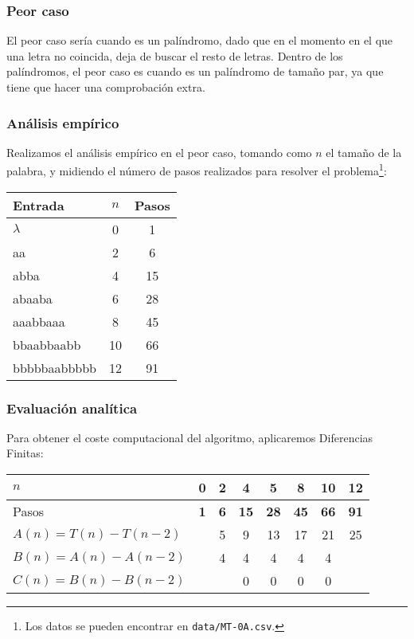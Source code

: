 \subsubsection*{Peor caso}
El peor caso sería cuando es un palíndromo, dado que en el momento en el que una letra no coincida, deja de buscar el resto de letras. Dentro de los palíndromos, el peor caso es cuando es un palíndromo de tamaño par, ya que tiene que hacer una comprobación extra.

\subsubsection*{Análisis empírico}

Realizamos el análisis empírico en el peor caso, tomando como $n$ el tamaño de la palabra, y midiendo el número de pasos realizados para resolver el problema\footnote{Los datos se pueden encontrar en \texttt{data/MT-0A.csv}.}:

\begin{table}[h]
    \centering
    \begin{tabular}{lcc}
        Entrada & $n$ & Pasos \\
        \hline
        $\lambda$      & 0  & 1  \\
        aa             & 2  & 6  \\
        abba           & 4  & 15 \\
        abaaba         & 6  & 28 \\
        aaabbaaa       & 8  & 45 \\
        bbaabbaabb     & 10 & 66 \\
        bbbbbaabbbbb   & 12 & 91
    \end{tabular}
\end{table}


\subsubsection*{Evaluación analítica}
Para obtener el coste computacional del algoritmo, aplicaremos Diferencias Finitas:

\begin{table}[h]
    \centering
    \begin{tabular}{|l|c|c|c|c|c|c|c|}
        \hline
        $n$ & \textbf{0} & \textbf{2} & \textbf{4} & \textbf{5} & \textbf{8} & \textbf{10} & \textbf{12} \\ \hline
        Pasos & \textbf{1} & \textbf{6} & \textbf{15} & \textbf{28} & \textbf{45} & \textbf{66} & \textbf{91} \\ \hline
        \hline
        $A(n) = T(n) - T(n-2)$ &    &  5 &  9 & 13 & 17 & 21 & 25 \\ \hline
        $B(n) = A(n) - A(n-2)$ &    &  4 &  4 &  4 &  4 &  4 &    \\ \hline
        $C(n) = B(n) - B(n-2)$ &    &    &  0 &  0 &  0 &  0 &    \\ \hline
    \end{tabular}
\end{table}

